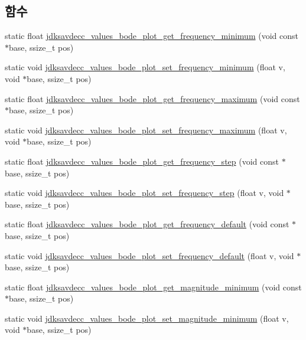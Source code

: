 \subsection*{함수}
\begin{DoxyCompactItemize}
\item 
static float \hyperlink{group__values__bode__plot_ga08397b0195112d93bebde35aa55513ad}{jdksavdecc\+\_\+values\+\_\+bode\+\_\+plot\+\_\+get\+\_\+frequency\+\_\+minimum} (void const $\ast$base, ssize\+\_\+t pos)
\item 
static void \hyperlink{group__values__bode__plot_ga4bc049bde001b125fef83160f6f5e502}{jdksavdecc\+\_\+values\+\_\+bode\+\_\+plot\+\_\+set\+\_\+frequency\+\_\+minimum} (float v, void $\ast$base, ssize\+\_\+t pos)
\item 
static float \hyperlink{group__values__bode__plot_gaaba2c0b4015b8af9d1a1544b471ad8f8}{jdksavdecc\+\_\+values\+\_\+bode\+\_\+plot\+\_\+get\+\_\+frequency\+\_\+maximum} (void const $\ast$base, ssize\+\_\+t pos)
\item 
static void \hyperlink{group__values__bode__plot_ga0650df7706ceeffaa288eb6f065c963d}{jdksavdecc\+\_\+values\+\_\+bode\+\_\+plot\+\_\+set\+\_\+frequency\+\_\+maximum} (float v, void $\ast$base, ssize\+\_\+t pos)
\item 
static float \hyperlink{group__values__bode__plot_ga9c15ecf092f10c2a1c179d73d09ee0e3}{jdksavdecc\+\_\+values\+\_\+bode\+\_\+plot\+\_\+get\+\_\+frequency\+\_\+step} (void const $\ast$base, ssize\+\_\+t pos)
\item 
static void \hyperlink{group__values__bode__plot_gab59cc094333d8adfee9dce3d030958a1}{jdksavdecc\+\_\+values\+\_\+bode\+\_\+plot\+\_\+set\+\_\+frequency\+\_\+step} (float v, void $\ast$base, ssize\+\_\+t pos)
\item 
static float \hyperlink{group__values__bode__plot_gac302033b82efb10723968fff4af183f9}{jdksavdecc\+\_\+values\+\_\+bode\+\_\+plot\+\_\+get\+\_\+frequency\+\_\+default} (void const $\ast$base, ssize\+\_\+t pos)
\item 
static void \hyperlink{group__values__bode__plot_gab236bb981ea93a9799523eb2037dca34}{jdksavdecc\+\_\+values\+\_\+bode\+\_\+plot\+\_\+set\+\_\+frequency\+\_\+default} (float v, void $\ast$base, ssize\+\_\+t pos)
\item 
static float \hyperlink{group__values__bode__plot_ga572623f6c98a5b0893311392bd99c1c2}{jdksavdecc\+\_\+values\+\_\+bode\+\_\+plot\+\_\+get\+\_\+magnitude\+\_\+minimum} (void const $\ast$base, ssize\+\_\+t pos)
\item 
static void \hyperlink{group__values__bode__plot_gac46cee4d37a2740863d8e6c20e0eb2b4}{jdksavdecc\+\_\+values\+\_\+bode\+\_\+plot\+\_\+set\+\_\+magnitude\+\_\+minimum} (float v, void $\ast$base, ssize\+\_\+t pos)

\end{DoxyCompactItemize}

